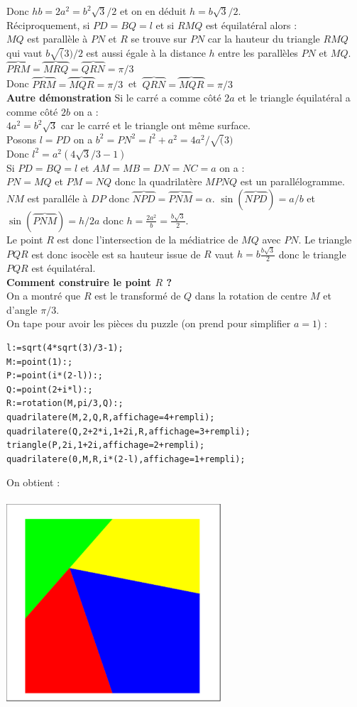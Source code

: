 \documentclass[a4paper,11pt]{book}
\begin{document}
Donc $hb=2a^2=b^2\sqrt 3/2$ et on en d\'eduit $h=b\sqrt 3/2$.\\
R\'eciproquement, si $PD=BQ=l$ et si $RMQ$ est \'equilat\'eral alors :\\
$MQ$ est parall\`ele \`a $PN$ et 
$R$ se trouve sur $PN$ car la hauteur du triangle $RMQ$ qui vaut 
$b\sqrt(3)/2$ est aussi \'egale \`a la distance $h$ entre 
les parall\`eles  $PN$ et $MQ$.
$\overbrace{PRM}=\overbrace{MRQ}=\overbrace{QRN}=\pi/3$\\
Donc 
$\overbrace{PRM}=\overbrace{MQR}=\pi/3\ $ et
$\ \overbrace{QRN}=\overbrace{MQR}=\pi/3$\\
{\bf Autre d\'emonstration}
Si le carr\'e a comme c\^ot\'e $2a$ et le triangle \'equilat\'eral a comme 
c\^ot\'e $2b$ on a :\\
$4a^2=b^2\sqrt 3$ car le carr\'e et le triangle ont m\^eme surface.\\
Posons $l=PD$ on a $b^2=PN^2=l^2+a^2=4a^2/\sqrt(3)$\\
Donc $l^2=a^2(4\sqrt 3/3-1)$\\
Si $PD=BQ=l$ et $AM=MB=DN=NC=a$ on a :\\
$PN=MQ$ et $PM=NQ$ donc la quadrilat\`ere $MPNQ$ est un parall\'elogramme.
$NM$ est parall\'ele \`a $DP$ donc $\overbrace{NPD}=\overbrace{PNM}=\alpha$.
$\sin(\overbrace{NPD})=a/b$ et $\sin(\overbrace{PNM})=h/2a$ donc
$h=\frac{2a^2}{b}=\frac{b\sqrt 3}{2}$.\\
Le point $R$ est donc l'intersection de la m\'ediatrice de $MQ$ avec $PN$.
Le triangle $PQR$ est donc isoc\`ele est sa hauteur issue de $R$ vaut
$h=b\frac{b\sqrt 3}{2}$ donc le triangle $PQR$ est \'equilat\'eral.\\
{\bf Comment construire le point $R$ ?}\\
On a montr\'e que $R$ est le transform\'e de $Q$ dans la rotation de centre $M$
 et d'angle $\pi/3$.\\
On tape pour avoir les pi\`eces du puzzle (on prend pour simplifier $a=1$) :
\begin{verbatim}
l:=sqrt(4*sqrt(3)/3-1);
M:=point(1):;
P:=point(i*(2-l)):;
Q:=point(2+i*l):;
R:=rotation(M,pi/3,Q):;
quadrilatere(M,2,Q,R,affichage=4+rempli); 
quadrilatere(Q,2+2*i,1+2i,R,affichage=3+rempli); 
triangle(P,2i,1+2i,affichage=2+rempli);
quadrilatere(0,M,R,i*(2-l),affichage=1+rempli); 
\end{verbatim}
On obtient :\\
\ \\
\includegraphics[width=8cm]{puzzleca}\\
\end{document}
